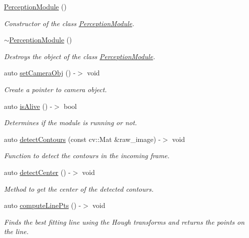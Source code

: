 \begin{DoxyCompactItemize}
\item 
\hyperlink{class_perception_module_a62e6934da7b7ab114c02a34e8030e0ec}{Perception\+Module} ()
\begin{DoxyCompactList}\small\item\em Constructor of the class \hyperlink{class_perception_module}{Perception\+Module}. \end{DoxyCompactList}\item 
\hyperlink{class_perception_module_a52bf1fd6688cd15a6687bc8af69bf116}{$\sim$\+Perception\+Module} ()
\begin{DoxyCompactList}\small\item\em Destroys the object of the class \hyperlink{class_perception_module}{Perception\+Module}. \end{DoxyCompactList}\item 
auto \hyperlink{class_perception_module_a60ab0780b4400096b029698b6c8f0dc7}{set\+Camera\+Obj} () -\/$>$ void
\begin{DoxyCompactList}\small\item\em Create a pointer to camera object. \end{DoxyCompactList}\item 
auto \hyperlink{class_perception_module_a934854719b0e95576883b7cb5098a7a5}{is\+Alive} () -\/$>$ bool
\begin{DoxyCompactList}\small\item\em Determines if the module is running or not. \end{DoxyCompactList}\item 
auto \hyperlink{class_perception_module_a851a7c7b5e9e11459dd171bb31128402}{detect\+Contours} (const cv\+::\+Mat \&raw\+\_\+image) -\/$>$ void
\begin{DoxyCompactList}\small\item\em Function to detect the contours in the incoming frame. \end{DoxyCompactList}\item 
auto \hyperlink{class_perception_module_ad3c7a85f300e3a545da8a619af99d4de}{detect\+Center} () -\/$>$ void
\begin{DoxyCompactList}\small\item\em Method to get the center of the detected contours. \end{DoxyCompactList}\item 
auto \hyperlink{class_perception_module_a85bf112d0310cbc6a3160e3ea24f201e}{compute\+Line\+Pts} () -\/$>$ void
\begin{DoxyCompactList}\small\item\em Finds the best fitting line using the Hough transforms and returns the points on the line. \end{DoxyCompactList}\item 

\end{DoxyCompactItemize}
